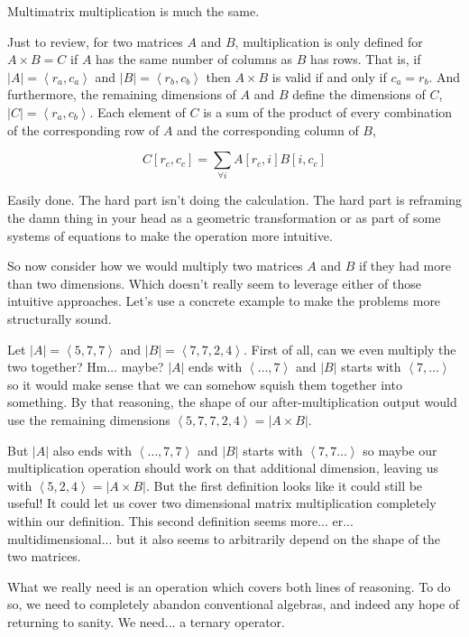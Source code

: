 \documentclass[12pt]{book}
\theoremstyle{plain}
\theoremstyle{definition}
\theoremstyle{ppart}
\theoremstyle{case}
\theoremstyle{solution}
\newcommand{\shape}[1]{\left|#1\right|}
\begin{document}
Multimatrix multiplication is much the same.

Just to review, for two matrices $A$ and $B$, multiplication is only defined
for $A \times B = C$ if $A$ has the same number of columns as $B$ has rows.
That is, if $\shape{A} = \left< r_a, c_a \right>$ and $\shape{B} = \left< r_b, c_b \right>$
then $A \times B$ is valid if and only if $c_a = r_b$. And furthermore,
the remaining dimensions of $A$ and $B$ define the dimensions of $C$,
$\shape{C} = \left< r_a, c_b \right>$. Each element of $C$ is a sum of the product of
every combination of the corresponding row of $A$ and the corresponding column of
$B$,

\[ C[r_c, c_c] = \sum_{\forall i} A[r_c, i] B[i, c_c] \]

Easily done. The hard part isn't doing the calculation. The hard part is reframing the
damn thing in your head as a geometric transformation or as part of some
systems of equations to make the operation more intuitive.

So now consider how we would multiply two matrices $A$ and $B$ if they had more
than two dimensions. Which doesn't really seem to leverage either of those intuitive
approaches. Let's use a concrete example to make the problems more structurally sound.

Let $\shape{A} = \left<5,7,7\right>$ and $\shape{B} = \left<7,7,2,4\right>$.
First of all, can we even multiply the two together? Hm... maybe? $\shape{A}$ ends with
$\left<\ldots, 7\right>$ and $\shape{B}$ starts with $\left<7,\ldots\right>$ so it would
make sense that we can somehow squish them together into something. By that reasoning,
the shape of our after-multiplication output would use the remaining dimensions
$\left<5, 7, 7, 2, 4\right> = \shape{A \times B}$.

But $\shape{A}$ also ends with $\left<\ldots, 7, 7\right>$ and $\shape{B}$ starts with
$\left<7, 7\ldots\right>$ so maybe our multiplication operation should work on that
additional dimension, leaving us with $\left<5, 2, 4\right> = \shape{A \times B}$.
But the first definition looks like it could still be useful! It could let us cover 
two dimensional matrix multiplication completely within our definition. This second
definition seems more... er... multidimensional... but it also seems to
arbitrarily depend on the shape of the two matrices.

What we really need is an operation which covers both lines of reasoning. To do
so, we need to completely abandon conventional algebras, and indeed any hope of
returning to sanity. We need... a ternary operator.
\end{document}
